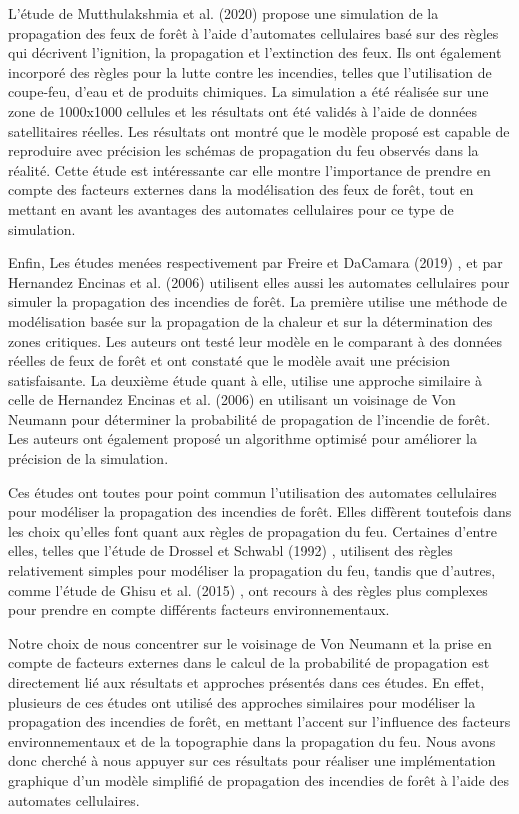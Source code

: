 L'étude de Mutthulakshmia et al. (2020) \parencite{mutthulakshmia2020} propose une simulation de la propagation des feux de forêt à l'aide d'automates cellulaires basé sur des règles qui décrivent l'ignition, la propagation et l'extinction des feux. Ils ont également incorporé des règles pour la lutte contre les incendies, telles que l'utilisation de coupe-feu, d'eau et de produits chimiques. La simulation a été réalisée sur une zone de 1000x1000 cellules et les résultats ont été validés à l'aide de données satellitaires réelles. Les résultats ont montré que le modèle proposé est capable de reproduire avec précision les schémas de propagation du feu observés dans la réalité. Cette étude est intéressante car elle montre l'importance de prendre en compte des facteurs externes dans la modélisation des feux de forêt, tout en mettant en avant les avantages des automates cellulaires pour ce type de simulation.

Enfin, Les études menées respectivement par Freire et DaCamara (2019) \parencite{freire2019}, et par Hernandez Encinas et al. (2006) \parencite{encinas2006} utilisent elles aussi les automates cellulaires pour simuler la propagation des incendies de forêt. La première utilise une méthode de modélisation basée sur la propagation de la chaleur et sur la détermination des zones critiques. Les auteurs ont testé leur modèle en le comparant à des données réelles de feux de forêt et ont constaté que le modèle avait une précision satisfaisante. La deuxième étude quant à elle, utilise une approche similaire à celle de Hernandez Encinas et al. (2006) \parencite{hernandez2006} en utilisant un voisinage de Von Neumann pour déterminer la probabilité de propagation de l'incendie de forêt. Les auteurs ont également proposé un algorithme optimisé pour améliorer la précision de la simulation.

Ces études ont toutes pour point commun l'utilisation des automates cellulaires pour modéliser la propagation des incendies de forêt. Elles diffèrent toutefois dans les choix qu'elles font quant aux règles de propagation du feu. Certaines d'entre elles, telles que l'étude de Drossel et Schwabl (1992) \parencite{drossel1992}, utilisent des règles relativement simples pour modéliser la propagation du feu, tandis que d'autres, comme l'étude de Ghisu et al. (2015) \parencite{ghisu2015}, ont recours à des règles plus complexes pour prendre en compte différents facteurs environnementaux.

Notre choix de nous concentrer sur le voisinage de Von Neumann et la prise en compte de facteurs externes dans le calcul de la probabilité de propagation est directement lié aux résultats et approches présentés dans ces études. En effet, plusieurs de ces études ont utilisé des approches similaires pour modéliser la propagation des incendies de forêt, en mettant l'accent sur l'influence des facteurs environnementaux et de la topographie dans la propagation du feu. Nous avons donc cherché à nous appuyer sur ces résultats pour réaliser une implémentation graphique d’un modèle simplifié de propagation des incendies de forêt à l'aide des automates cellulaires.